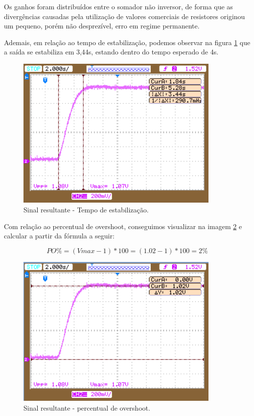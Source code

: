 Os ganhos foram distribuídos entre o somador não inversor, de forma que as divergências causadas pela utilização de valores comerciais de resistores originou um pequeno, porém não desprezível, erro em regime permanente. 

Ademais, em relação ao tempo de estabilização, podemos observar na figura \ref{rea:4} que a saída se estabiliza em 3,44s, estando dentro do tempo esperado de 4s.

\begin{figure}[H]
\begin{center}
    \includegraphics[width=10cm]{images/state/State1.png}  
\end{center}
\caption{Sinal resultante - Tempo de estabilização.}
\label{rea:4} 
\end{figure}

Com relação ao percentual de overshoot, conseguimos visualizar na imagem \ref{rea:5} e calcular a partir da fórmula a seguir: 

\begin{equation} \label{g:PO}
    PO\% = (Vmax-1)*100 = (1.02-1)*100 =2\%
\end{equation}

\begin{figure}[H]
\begin{center}
    \includegraphics[width=10cm]{images/state/State0.png}  
\end{center}
\caption{Sinal resultante - percentual de overshoot.}
\label{rea:5} 
\end{figure}

\pagebreak

